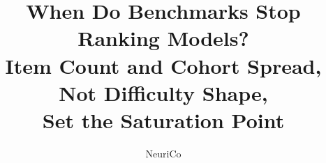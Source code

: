 \documentclass{article}
\title{When Do Benchmarks Stop Ranking Models?\\Item Count and Cohort Spread, Not Difficulty Shape,\\Set the Saturation Point}
\author{NeuriCo}
\begin{document}
\maketitle

\begin{abstract}

\end{abstract}










\appendix

\end{document}
